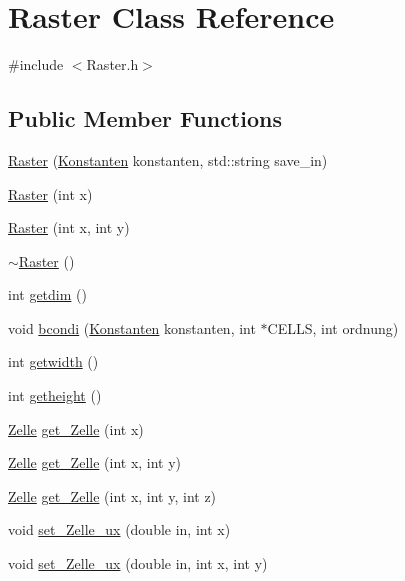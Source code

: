 \hypertarget{classRaster}{\section{Raster Class Reference}
\label{classRaster}
}


{\ttfamily \#include $<$Raster.\-h$>$}

\subsection*{Public Member Functions}
\begin{DoxyCompactItemize}
\item 
\hyperlink{classRaster_a068b4601a342bfc843b6fa59b6366049}{Raster} (\hyperlink{classKonstanten}{Konstanten} konstanten, std\-::string save\-\_\-in)
\item 
\hyperlink{classRaster_a9b20b854b87a6d7ffe61fea049fdf565}{Raster} (int x)
\item 
\hyperlink{classRaster_af89293dd7252fdc5bb5fbfdbe091e2b1}{Raster} (int x, int y)
\item 
\hyperlink{classRaster_ab5f3ec20a0cb4dc2ea18905d2e7899f6}{$\sim$\-Raster} ()
\item 
int \hyperlink{classRaster_a2fbb6aa8f878f18a93d003ea5b7fc71f}{getdim} ()
\item 
void \hyperlink{classRaster_acdd360132d43d53f33498e1a509b7931}{bcondi} (\hyperlink{classKonstanten}{Konstanten} konstanten, int $\ast$C\-E\-L\-L\-S, int ordnung)
\item 
int \hyperlink{classRaster_a592a6f5a93c541f307e73a13e4fce5f2}{getwidth} ()
\item 
int \hyperlink{classRaster_ab4e973bea907edf806e28d167d3b1b63}{getheight} ()
\item 
\hyperlink{classZelle}{Zelle} \hyperlink{classRaster_ac553ef17e29d5a1113e9f0db125f694e}{get\-\_\-\-Zelle} (int x)
\item 
\hyperlink{classZelle}{Zelle} \hyperlink{classRaster_ad049ded3b567bdc2b086c65c41a000b7}{get\-\_\-\-Zelle} (int x, int y)
\item 
\hyperlink{classZelle}{Zelle} \hyperlink{classRaster_aeac4ac67ce8125baccca894a27f49d67}{get\-\_\-\-Zelle} (int x, int y, int z)
\item 
void \hyperlink{classRaster_acec8554a0d41e393fb98026a165129e6}{set\-\_\-\-Zelle\-\_\-ux} (double in, int x)
\item 
void \hyperlink{classRaster_a8fed08552b9ce3539fb8912cc4e9048f}{set\-\_\-\-Zelle\-\_\-ux} (double in, int x, int y)

\end{DoxyCompactItemize}
